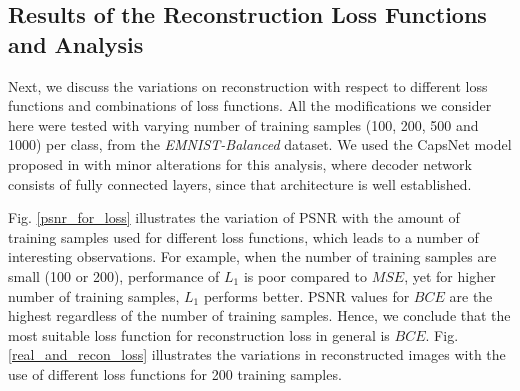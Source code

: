 \subsection{Results of the Reconstruction Loss Functions and Analysis}
Next, we discuss the variations on reconstruction with respect to different loss functions and combinations of loss functions. All the modifications we consider here were tested with varying number of training samples (100, 200, 500 and 1000) per class, from the \textit{EMNIST-Balanced} dataset. 
We used the CapsNet model proposed in \cite{sabour2017dynamic} with minor alterations for this analysis, where decoder network consists of fully connected layers, since that architecture is well established. 

% 


Fig. \ref{psnr_for_loss} illustrates the variation of PSNR with the amount of training samples used for different loss functions, which leads to a number of interesting observations. For example, when the number of training samples are small (100 or 200), performance of $L_1$ is poor compared to $MSE$, yet for higher number of training samples, $L_1$ performs better. PSNR values for $BCE$ are the highest regardless of the number of training samples. Hence, we conclude that the most suitable loss function for reconstruction loss in general is $BCE$. Fig. \ref{real_and_recon_loss} illustrates the variations in reconstructed images with the use of different loss functions for 200 training samples.

